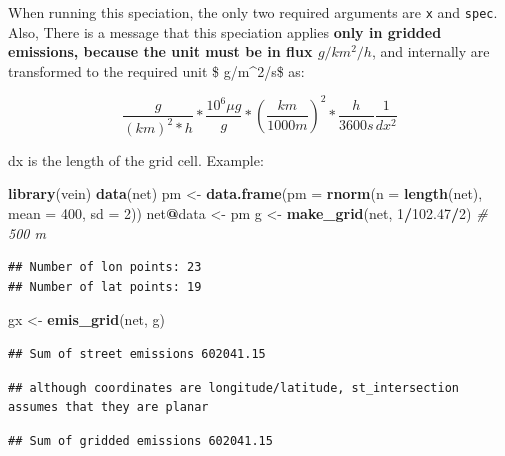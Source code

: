 \documentclass[12pt,graybox,envcountchap,sectrefs]{krantz}
\makeatletter
\newenvironment{Shaded}{\begin{snugshade}}{\end{snugshade}}
\newcommand{\KeywordTok}[1]{\textcolor[rgb]{0.13,0.29,0.53}{\textbf{#1}}}
\newcommand{\DataTypeTok}[1]{\textcolor[rgb]{0.13,0.29,0.53}{#1}}
\newcommand{\DecValTok}[1]{\textcolor[rgb]{0.00,0.00,0.81}{#1}}
\newcommand{\FloatTok}[1]{\textcolor[rgb]{0.00,0.00,0.81}{#1}}
\newcommand{\StringTok}[1]{\textcolor[rgb]{0.31,0.60,0.02}{#1}}
\newcommand{\CommentTok}[1]{\textcolor[rgb]{0.56,0.35,0.01}{\textit{#1}}}
\newcommand{\OperatorTok}[1]{\textcolor[rgb]{0.81,0.36,0.00}{\textbf{#1}}}
\newcommand{\NormalTok}[1]{#1}
\newenvironment{kframe}{%
\medskip{}
\setlength{\fboxsep}{.8em}
 \def\at@end@of@kframe{}%
 \ifinner\ifhmode%
  \def\at@end@of@kframe{\end{minipage}}%
  \begin{minipage}{\columnwidth}%
 \fi\fi%
 \def\FrameCommand##1{\hskip\@totalleftmargin \hskip-\fboxsep
 \colorbox{shadecolor}{##1}\hskip-\fboxsep
     \hskip-\linewidth \hskip-\@totalleftmargin \hskip\columnwidth}%
 \MakeFramed {\advance\hsize-\width
   \@totalleftmargin\z@ \linewidth\hsize
   \@setminipage}}%
 {\par\unskip\endMakeFramed%
 \at@end@of@kframe}
\renewenvironment{Shaded}{\begin{kframe}}{\end{kframe}}
\theoremstyle{definition}
\theoremstyle{definition}
\theoremstyle{definition}
\theoremstyle{remark}
\makeatother
\begin{document}
When running this speciation, the only two required arguments are
\texttt{x} and \texttt{spec}. Also, There is a message that this
speciation applies \textbf{only in gridded emissions, because the unit
must be in flux \(g/km^2/h\)}, and internally are transformed to the
required unit \$ \mu g/m\^{}2/s\$ as:

\[ \frac{g}{(km)^2*h}*\frac{10^6 \mu g}{g}*(\frac{km}{1000m})^2*\frac{h}{3600s}\frac{1}{dx^2}\]

dx is the length of the grid cell. Example:

\begin{Shaded}
\begin{Highlighting}[]
\KeywordTok{library}\NormalTok{(vein)}
\KeywordTok{data}\NormalTok{(net)}
\NormalTok{pm <-}\StringTok{ }\KeywordTok{data.frame}\NormalTok{(}\DataTypeTok{pm =} \KeywordTok{rnorm}\NormalTok{(}\DataTypeTok{n =} \KeywordTok{length}\NormalTok{(net), }\DataTypeTok{mean =} \DecValTok{400}\NormalTok{, }\DataTypeTok{sd =} \DecValTok{2}\NormalTok{))}
\NormalTok{net}\OperatorTok{@}\NormalTok{data <-}\StringTok{ }\NormalTok{pm}
\NormalTok{g <-}\StringTok{ }\KeywordTok{make_grid}\NormalTok{(net, }\DecValTok{1}\OperatorTok{/}\FloatTok{102.47}\OperatorTok{/}\DecValTok{2}\NormalTok{) }\CommentTok{# 500 m}
\end{Highlighting}
\end{Shaded}

\begin{verbatim}
## Number of lon points: 23
## Number of lat points: 19
\end{verbatim}

\begin{Shaded}
\begin{Highlighting}[]
\NormalTok{gx <-}\StringTok{ }\KeywordTok{emis_grid}\NormalTok{(net, g)}
\end{Highlighting}
\end{Shaded}

\begin{verbatim}
## Sum of street emissions 602041.15
\end{verbatim}

\begin{verbatim}
## although coordinates are longitude/latitude, st_intersection assumes that they are planar
\end{verbatim}

\begin{verbatim}
## Sum of gridded emissions 602041.15
\end{verbatim}
\end{document}
